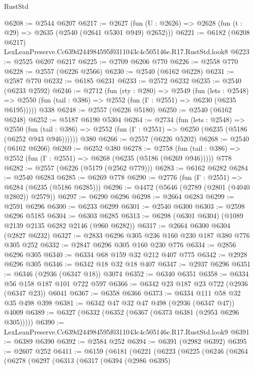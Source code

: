 \begin{lexlean}{RustStd}
\begin{coremodule}
@6208 := @2544 @6207
@6217 := @2627 (fun (U : @2626) => @2628 (fun (t : @29) => @2635 (@2540 (@2641 @5301 @949) @2652)))
@6221 := @6182 (@6208 @6217) LexLeanPreserve.Cc639d244984595f0311043c4c505146e.R17.RustStd.look8
@6223 := @2525 @6207 @6217
@6225 := @2709 @6206 @770
@6226 := @2558 @770
@6228 := @2557 (@6226 @2566)
@6230 := @2540 (@6162 @6228)
@6231 := @2587 @770
@6232 := @6185 @6231
@6233 := @2572 @6232
@6235 := @2540 (@6233 @2592)
@6246 := @2712
    (fun (rty : @280) =>
    @2549
      (fun (lets : @2548) =>
      @2550 (fun (tail : @386) => @2552 (fun (Γ : @2551) => @6230 (@6235 @6195)))))
    @338
@6248 := @2557 (@6226 @5180)
@6250 := @2540 (@6162 @6248)
@6252 := @5187 @6190 @5304
@6264 := @2734
    (fun (lets : @2548) =>
    @2550 (fun (tail : @386) => @2552 (fun (Γ : @2551) => @6250 (@6235 (@5186 (@6252 @943 @946))))))
    @380
@6266 := @2557 (@6226 @5202)
@6268 := @2540 (@6162 @6266)
@6269 := @6252 @380
@6278 := @2758
    (fun (tail : @386) => @2552 (fun (Γ : @2551) => @6268 (@6235 (@5186 (@6269 @946)))))
    @778
@6282 := @2557 (@6226 (@5179 (@2562 @779)))
@6283 := @6162 @6282
@6284 := @2540 @6283
@6285 := @6269 @778
@6290 := @2776 (fun (Γ : @2551) => @6284 (@6235 (@5186 @6285)))
@6296 := @4472 (@5646 (@2789 (@2801 (@4040 @2802)) @2579))
@6297 := @6290 @6296
@6298 := @2664 @6283
@6299 := @2591 @6296
@6300 := @6233 @6299
@6301 := @2540 @6300
@6303 := @2598 @6296 @5185
@6304 := @6303 @6285
@6313 := @6298 (@6301 @6304) (@1089 @2139 @2135 @6282 @2146 (@960 @6282))
@6317 := @2664 @6300 @6304 (@2827 @6232)
@6327 := @2833 @6296 @305 @236 @160 @230 @187 @380 @776 @305 @252
@6332 := @2847 @6296 @305 @160 @230 @776
@6334 := @2856 @6296 @305
@6340 := @6334 @68 @159 @32 @212 @407 @775
@6342 := @2928 @6296 @305
@6346 := @6342 @18 @32 @18 @407
@6347 := @2937 @6296
@6351 := @6346 (@2936 (@6347 @18)) @3074
@6352 := @6340 @6351
@6358 := @6334 @56 @158 @187 @101 @722 @597
@6366 := @6342 @23 @187 @23 @722 (@2936 (@6347 @23)) @6041
@6367 := @6358 @6366
@6373 := @6334 @111 @58 @32 @35 @498 @398
@6381 := @6342 @47 @32 @47 @498 (@2936 (@6347 @47)) @4009
@6389 := @6327 (@6332 (@6352 (@6367 (@6373 @6381 (@2953 @6296 @305)))))
@6390 := LexLeanPreserve.Cc639d244984595f0311043c4c505146e.R17.RustStd.look9
@6391 := @6389 @6390
@6392 := @2584 @252
@6394 := @6391 (@2982 @6392)
@6395 := @2607 @252
@6411 := @6159
    (@6181
      (@6221
        (@6223
          (@6225
            (@6246
              (@6264
                (@6278
                  (@6297
                    (@6313
                      (@6317
                        (@6394
                          (@2986 @6395)

\end{coremodule}
\end{lexlean}
